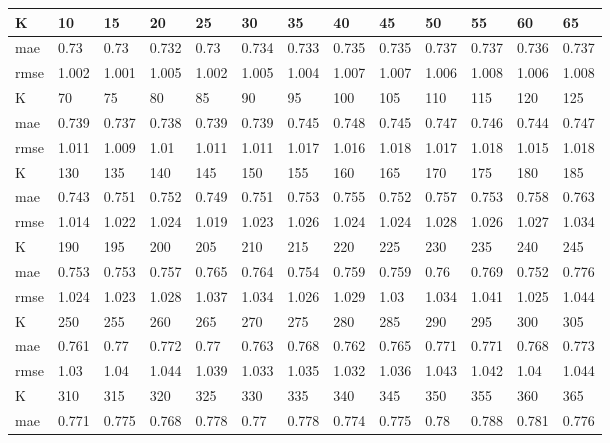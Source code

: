 \begin{appendices}
\begin{center} \label{tab22}	
	\begin{tabularx}{\textwidth}{|l|X|X|X|X|X|X|X|X|X|X|X|X|} 
		\hline 
		K & 10 & 15 & 20 & 25 & 30 & 35 & 40 & 45 & 50 & 55 & 60 & 65 \\ \hline 
		mae & 0.73 & 0.73 & 0.732 & 0.73 & 0.734 & 0.733 & 0.735 & 0.735 & 0.737 & 0.737 & 0.736 & 0.737 \\ \hline 
		rmse & 1.002 & 1.001 & 1.005 & 1.002 & 1.005 & 1.004 & 1.007 & 1.007 & 1.006 & 1.008 & 1.006 & 1.008 \\ \hline 
		\hline 
		K & 70 & 75 & 80 & 85 & 90 & 95 & 100 & 105 & 110 & 115 & 120 & 125 \\ \hline 
		mae & 0.739 & 0.737 & 0.738 & 0.739 & 0.739 & 0.745 & 0.748 & 0.745 & 0.747 & 0.746 & 0.744 & 0.747 \\ \hline 
		rmse & 1.011 & 1.009 & 1.01 & 1.011 & 1.011 & 1.017 & 1.016 & 1.018 & 1.017 & 1.018 & 1.015 & 1.018 \\ \hline 
		\hline 
		K & 130 & 135 & 140 & 145 & 150 & 155 & 160 & 165 & 170 & 175 & 180 & 185 \\ \hline 
		mae & 0.743 & 0.751 & 0.752 & 0.749 & 0.751 & 0.753 & 0.755 & 0.752 & 0.757 & 0.753 & 0.758 & 0.763 \\ \hline 
		rmse & 1.014 & 1.022 & 1.024 & 1.019 & 1.023 & 1.026 & 1.024 & 1.024 & 1.028 & 1.026 & 1.027 & 1.034 \\ \hline 
		\hline 
		K & 190 & 195 & 200 & 205 & 210 & 215 & 220 & 225 & 230 & 235 & 240 & 245 \\ \hline 
		mae & 0.753 & 0.753 & 0.757 & 0.765 & 0.764 & 0.754 & 0.759 & 0.759 & 0.76 & 0.769 & 0.752 & 0.776 \\ \hline 
		rmse & 1.024 & 1.023 & 1.028 & 1.037 & 1.034 & 1.026 & 1.029 & 1.03 & 1.034 & 1.041 & 1.025 & 1.044 \\ \hline 
		\hline 
		K & 250 & 255 & 260 & 265 & 270 & 275 & 280 & 285 & 290 & 295 & 300 & 305 \\ \hline 
		mae & 0.761 & 0.77 & 0.772 & 0.77 & 0.763 & 0.768 & 0.762 & 0.765 & 0.771 & 0.771 & 0.768 & 0.773 \\ \hline 
		rmse & 1.03 & 1.04 & 1.044 & 1.039 & 1.033 & 1.035 & 1.032 & 1.036 & 1.043 & 1.042 & 1.04 & 1.044 \\ \hline 
		\hline 
		K & 310 & 315 & 320 & 325 & 330 & 335 & 340 & 345 & 350 & 355 & 360 & 365 \\ \hline 
		mae & 0.771 & 0.775 & 0.768 & 0.778 & 0.77 & 0.778 & 0.774 & 0.775 & 0.78 & 0.788 & 0.781 & 0.776 \\ \hline 

\end{tabularx}
\end{center}
\end{appendices}

